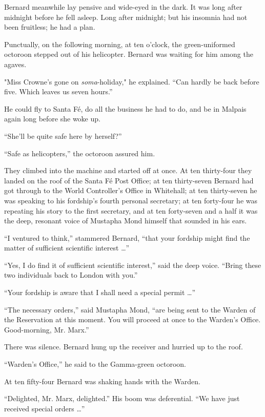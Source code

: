 \documentclass[12pt]{report}
\begin{document}
Bernard meanwhile lay pensive and wide-eyed in the dark. It was long
after midnight before he fell asleep. Long after midnight; but his
insomnia had not been fruitless; he had a plan.

Punctually, on the following morning, at ten o'clock, the
green-uniformed octoroon stepped out of his helicopter. Bernard was
waiting for him among the agaves.

"Miss Crowne's gone on \emph{soma}-holiday," he explained. ``Can hardly
be back before five. Which leaves us seven hours.''

He could fly to Santa Fé, do all the business he had to do, and be in
Malpais again long before she woke up.

``She'll be quite safe here by herself?''

``Safe as helicopters,'' the octoroon assured him.

They climbed into the machine and started off at once. At ten
thirty-four they landed on the roof of the Santa Fé Post Office; at ten
thirty-seven Bernard had got through to the World Controller's Office in
Whitehall; at ten thirty-seven he was speaking to his fordship's fourth
personal secretary; at ten forty-four he was repeating his story to the
first secretary, and at ten forty-seven and a half it was the deep,
resonant voice of Mustapha Mond himself that sounded in his ears.

``I ventured to think,'' stammered Bernard, ``that your fordship might
find the matter of sufficient scientific interest \ldots{}''

``Yes, I do find it of sufficient scientific interest,'' said the deep
voice. ``Bring these two individuals back to London with you.''

``Your fordship is aware that I shall need a special permit \ldots{}''

``The necessary orders,'' said Mustapha Mond, ``are being sent to the
Warden of the Reservation at this moment. You will proceed at once to
the Warden's Office. Good-morning, Mr. Marx.''

There was silence. Bernard hung up the receiver and hurried up to the
roof.

``Warden's Office,'' he said to the Gamma-green octoroon.

At ten fifty-four Bernard was shaking hands with the Warden.

``Delighted, Mr. Marx, delighted.'' His boom was deferential. ``We have
just received special orders \ldots{}''
\end{document}
